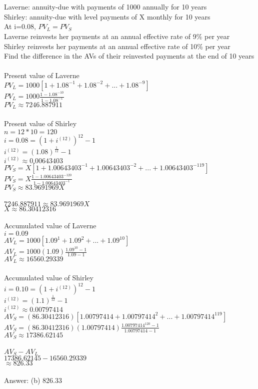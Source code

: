 \documentclass[12pt]{article}
\begin{document}
\section{}
Laverne: annuity-due with payments of 1000 annually for 10 years\\
Shirley: annuity-due with level payments of X monthly for 10 years\\
At i=0.08, $PV_L=PV_S$\\
Laverne reinvests her payments at an annual effective rate of 9\% per year\\
Shirley reinvests her payments at an annual effective rate of 10\% per year\\
Find the difference in the AVs of their reinvested payments at the end of 10 years\\
\\
Present value of Laverne\\
$PV_L=1000[1+1.08^{-1}+1.08^{-2}+...+1.08^{-9}]$\\
$PV_L=1000\frac{1-1.08^{-10}}{1-1.08^{-1}}$\\
$PV_L\approx7246.887911$\\
\\
Present value of Shirley\\
$n=12*10=120$\\
$i=0.08=(1+i^{(12)})^{12}-1$\\
$i^{(12)}=(1.08)^{\frac{1}{12}}-1$\\
$i^{(12)}\approx0.00643403$\\
$PV_S=X[1+1.00643403^{-1}+1.00643403^{-2}+...+1.00643403^{-119}]$\\
$PV_S=X\frac{1-1.00643403^{-120}}{1-1.00643403^{-1}}$\\
$PV_S\approx83.9691969X$\\
\\
$7246.887911\approx83.9691969X$\\
$X\approx86.30412316$\\
\\
Accumulated value of Laverne\\
$i=0.09$\\
$AV_L=1000[1.09^{1}+1.09^{2}+...+1.09^{10}]$\\
$AV_L=1000(1.09)\frac{1.09^{10}-1}{1.09-1}$\\
$AV_L\approx16560.29339$\\
\\
Accumulated value of Shirley\\
$i=0.10=(1+i^{(12)})^{12}-1$\\
$i^{(12)}=(1.1)^{\frac{1}{12}}-1$\\
$i^{(12)}\approx0.00797414$\\
$AV_S=(86.30412316)[1.00797414+1.00797414^{2}+...+1.00797414^{119}]$\\
$AV_S=(86.30412316)(1.00797414)\frac{1.00797414^{120}-1}{1.00797414-1}$\\
$AV_S\approx17386.62145$\\
\\
$AV_S-AV_L$\\
$17386.62145-16560.29339$\\
$\approx826.33$\\
\\
Answer: (b) 826.33
\end{document}

